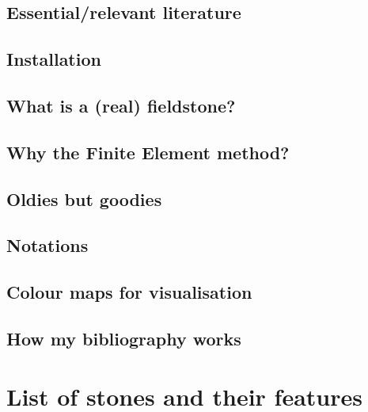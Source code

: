 \documentclass[a4paper]{article}
\begin{document}
\subsection{Essential/relevant literature}  %
\subsection{Installation}  %
\subsection{What is a (real) fieldstone?}  %
\subsection{Why the Finite Element method?}  %
\subsection{Oldies but goodies}  %
\subsection{Notations}  %
\subsection{Colour maps for visualisation}  %
\subsection{How my bibliography works}  %

\section{List of stones and their features} %
\end{document}
